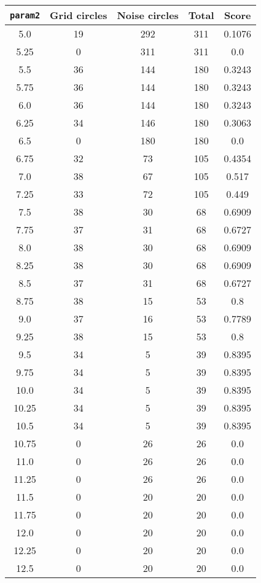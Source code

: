 \documentclass[letterpaper, 12pt]{article}
\begin{document}
\begin{longtable}{|c|c|c|c|c|}
\hline
\textbf{\texttt{param2}} & \textbf{Grid circles} & \textbf{Noise circles} & \textbf{Total} & \textbf{Score} \\
\hline
5.0 & 19 & 292 & 311 & 0.1076 \\
\hline
5.25 & 0 & 311 & 311 & 0.0 \\
\hline
5.5 & 36 & 144 & 180 & 0.3243 \\
\hline
5.75 & 36 & 144 & 180 & 0.3243 \\
\hline
6.0 & 36 & 144 & 180 & 0.3243 \\
\hline
6.25 & 34 & 146 & 180 & 0.3063 \\
\hline
6.5 & 0 & 180 & 180 & 0.0 \\
\hline
6.75 & 32 & 73 & 105 & 0.4354 \\
\hline
7.0 & 38 & 67 & 105 & 0.517 \\
\hline
7.25 & 33 & 72 & 105 & 0.449 \\
\hline
7.5 & 38 & 30 & 68 & 0.6909 \\
\hline
7.75 & 37 & 31 & 68 & 0.6727 \\
\hline
8.0 & 38 & 30 & 68 & 0.6909 \\
\hline
8.25 & 38 & 30 & 68 & 0.6909 \\
\hline
8.5 & 37 & 31 & 68 & 0.6727 \\
\hline
8.75 & 38 & 15 & 53 & 0.8 \\
\hline
9.0 & 37 & 16 & 53 & 0.7789 \\
\hline
9.25 & 38 & 15 & 53 & 0.8 \\
\hline
9.5 & 34 & 5 & 39 & 0.8395 \\
\hline
9.75 & 34 & 5 & 39 & 0.8395 \\
\hline
10.0 & 34 & 5 & 39 & 0.8395 \\
\hline
10.25 & 34 & 5 & 39 & 0.8395 \\
\hline
10.5 & 34 & 5 & 39 & 0.8395 \\
\hline
10.75 & 0 & 26 & 26 & 0.0 \\
\hline
11.0 & 0 & 26 & 26 & 0.0 \\
\hline
11.25 & 0 & 26 & 26 & 0.0 \\
\hline
11.5 & 0 & 20 & 20 & 0.0 \\
\hline
11.75 & 0 & 20 & 20 & 0.0 \\
\hline
12.0 & 0 & 20 & 20 & 0.0 \\
\hline
12.25 & 0 & 20 & 20 & 0.0 \\
\hline
12.5 & 0 & 20 & 20 & 0.0 \\

\end{longtable}
\end{document}
